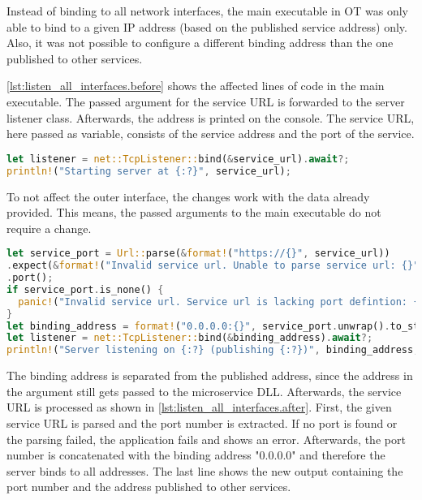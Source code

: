 Instead of binding to all network interfaces, the main executable in \ac{OT} was only able to bind to a given \ac{IP} address (based on the published service address) only. Also, it was not possible to configure a different binding address than the one published to other services.

\autoref{lst:listen_all_interfaces.before} shows the affected lines of code in the main executable. The passed argument for the service \ac{URL} is forwarded to the server listener class. Afterwards, the address is printed on the console. The service \ac{URL}, here passed as variable, consists of the service address and the port of the service.
\begin{lstlisting}[label=lst:listen_all_interfaces.before, caption={Listener binding before the applied changes (\textit{Microservices/OpenTwin/src/main.rs})}, language=rust, firstnumber=145]
let listener = net::TcpListener::bind(&service_url).await?;
println!("Starting server at {:?}", service_url);
\end{lstlisting}

To not affect the outer interface, the changes work with the data already provided. This means, the passed arguments to the main executable do not require a change.
\begin{lstlisting}[label=lst:listen_all_interfaces.after, caption={Listener binding after the applied changes. The service url is parsed, based on its port. Binding is done on all interfaces. (\textit{Microservices/OpenTwin/src/main.rs})}, language=rust, firstnumber=150]
let service_port = Url::parse(&format!("https://{}", service_url))
.expect(&format!("Invalid service url. Unable to parse service url: {}", service_url))
.port();
if service_port.is_none() {
  panic!("Invalid service url. Service url is lacking port defintion: {}", service_url);
}
let binding_address = format!("0.0.0.0:{}", service_port.unwrap().to_string());
let listener = net::TcpListener::bind(&binding_address).await?;
println!("Server listening on {:?} (publishing {:?})", binding_address, service_url);
\end{lstlisting}
The binding address is separated from the published address, since the address in the argument still gets passed to the microservice \ac{DLL}. Afterwards, the service \ac{URL} is processed as shown in \autoref{lst:listen_all_interfaces.after}. First, the given service \ac{URL} is parsed and the port number is extracted. If no port is found or the parsing failed, the application fails and shows an error. Afterwards, the port number is concatenated with the binding address "0.0.0.0" and therefore the server binds to all addresses. The last line shows the new output containing the port number and the address published to other services.

